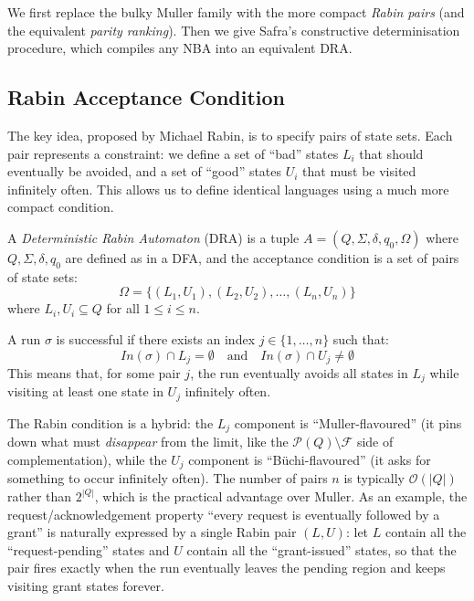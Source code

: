 We first replace the bulky Muller family with the more compact \emph{Rabin pairs} (and the equivalent \emph{parity ranking}). Then we give Safra's constructive determinisation procedure, which compiles any NBA into an equivalent DRA.

\subsection{Rabin Acceptance Condition}
\label{subsec:rabin-def}

The key idea, proposed by Michael Rabin, is to specify pairs of state sets. Each pair represents a constraint: we define a set of ``bad'' states $L_i$ that should eventually be avoided, and a set of ``good'' states $U_i$ that must be visited infinitely often. This allows us to define identical languages using a much more compact condition.

\begin{definition}
A \emph{Deterministic Rabin Automaton} (DRA) is a tuple $A = (Q, \Sigma, \delta, q_0, \Omega)$ where $Q, \Sigma, \delta, q_0$ are defined as in a DFA, and the acceptance condition is a set of pairs of state sets:
$$\Omega = \{ (L_1, U_1), (L_2, U_2), \dots, (L_n, U_n) \}$$
where $L_i, U_i \subseteq Q$ for all $1 \le i \le n$.
\end{definition}

A run $\sigma$ is successful if there exists an index $j \in \{1, \dots, n\}$ such that:
$$In(\sigma) \cap L_j = \emptyset \quad \text{and} \quad In(\sigma) \cap U_j \neq \emptyset$$
This means that, for some pair $j$, the run eventually avoids all states in $L_j$ while visiting at least one state in $U_j$ infinitely often.

The Rabin condition is a hybrid: the $L_j$ component is ``Muller-flavoured'' (it pins down what must \emph{disappear} from the limit, like the $\mathcal{P}(Q) \setminus \mathcal{F}$ side of complementation), while the $U_j$ component is ``Büchi-flavoured'' (it asks for something to occur infinitely often). The number of pairs $n$ is typically $\mathcal{O}(|Q|)$ rather than $2^{|Q|}$, which is the practical advantage over Muller. As an example, the request/acknowledgement property ``every request is eventually followed by a grant'' is naturally expressed by a single Rabin pair $(L, U)$: let $L$ contain all the ``request-pending'' states and $U$ contain all the ``grant-issued'' states, so that the pair fires exactly when the run eventually leaves the pending region and keeps visiting grant states forever.

